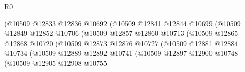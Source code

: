 \begin{lexlean}{R0}
\begin{coremodule}
                                                (@10509
                                                  @12833
                                                  @12836
                                                  @10692
                                                  (@10509
                                                    @12841
                                                    @12844
                                                    @10699
                                                    (@10509
                                                      @12849
                                                      @12852
                                                      @10706
                                                      (@10509
                                                        @12857
                                                        @12860
                                                        @10713
                                                        (@10509
                                                          @12865
                                                          @12868
                                                          @10720
                                                          (@10509
                                                            @12873
                                                            @12876
                                                            @10727
                                                            (@10509
                                                              @12881
                                                              @12884
                                                              @10734
                                                              (@10509
                                                                @12889
                                                                @12892
                                                                @10741
                                                                (@10509
                                                                  @12897
                                                                  @12900
                                                                  @10748
                                                                  (@10509
                                                                    @12905
                                                                    @12908
                                                                    @10755

\end{coremodule}
\end{lexlean}
